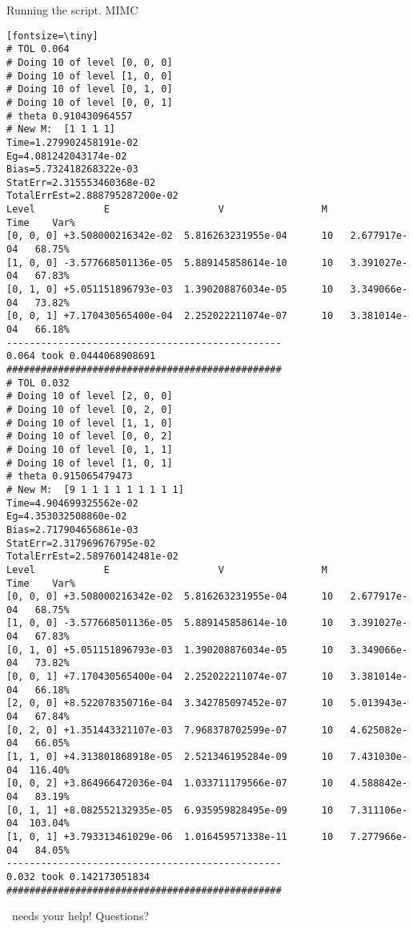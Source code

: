 \begin{frame}[fragile]{Running the script. MIMC}
\begin{verbatim}[fontsize=\tiny]
# TOL 0.064
# Doing 10 of level [0, 0, 0]
# Doing 10 of level [1, 0, 0]
# Doing 10 of level [0, 1, 0]
# Doing 10 of level [0, 0, 1]
# theta 0.910430964557
# New M:  [1 1 1 1]
Time=1.279902458191e-02
Eg=4.081242043174e-02
Bias=5.732418268322e-03
StatErr=2.315553460368e-02
TotalErrEst=2.888795287200e-02
Level            E                   V                 M           Time    Var%
[0, 0, 0] +3.508000216342e-02  5.816263231955e-04      10   2.677917e-04   68.75%
[1, 0, 0] -3.577668501136e-05  5.889145858614e-10      10   3.391027e-04   67.83%
[0, 1, 0] +5.051151896793e-03  1.390208876034e-05      10   3.349066e-04   73.82%
[0, 0, 1] +7.170430565400e-04  2.252022211074e-07      10   3.381014e-04   66.18%
------------------------------------------------
0.064 took 0.0444068908691
################################################
# TOL 0.032
# Doing 10 of level [2, 0, 0]
# Doing 10 of level [0, 2, 0]
# Doing 10 of level [1, 1, 0]
# Doing 10 of level [0, 0, 2]
# Doing 10 of level [0, 1, 1]
# Doing 10 of level [1, 0, 1]
# theta 0.915065479473
# New M:  [9 1 1 1 1 1 1 1 1 1]
Time=4.904699325562e-02
Eg=4.353032508860e-02
Bias=2.717904656861e-03
StatErr=2.317969676795e-02
TotalErrEst=2.589760142481e-02
Level            E                   V                 M           Time    Var%
[0, 0, 0] +3.508000216342e-02  5.816263231955e-04      10   2.677917e-04   68.75%
[1, 0, 0] -3.577668501136e-05  5.889145858614e-10      10   3.391027e-04   67.83%
[0, 1, 0] +5.051151896793e-03  1.390208876034e-05      10   3.349066e-04   73.82%
[0, 0, 1] +7.170430565400e-04  2.252022211074e-07      10   3.381014e-04   66.18%
[2, 0, 0] +8.522078350716e-04  3.342785097452e-07      10   5.013943e-04   67.84%
[0, 2, 0] +1.351443321107e-03  7.968378702599e-07      10   4.625082e-04   66.05%
[1, 1, 0] +4.313801868918e-05  2.521346195284e-09      10   7.431030e-04  116.40%
[0, 0, 2] +3.864966472036e-04  1.033711179566e-07      10   4.588842e-04   83.19%
[0, 1, 1] +8.082552132935e-05  6.935959828495e-09      10   7.311106e-04  103.04%
[1, 0, 1] +3.793313461029e-06  1.016459571338e-11      10   7.277966e-04   84.05%
------------------------------------------------
0.032 took 0.142173051834
################################################
\end{verbatim}
\end{frame}

\begin{frame}{\lib\ needs your help!}
Questions?
\end{frame}
